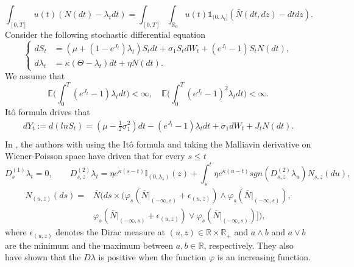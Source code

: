 \documentclass[11pt]{article}
\numberwithin{equation}{section}
\begin{document}
$$\int_{[0, T]} u(t) (N(dt) -\lambda_t dt) =\int_{[0, T]} \int_{\mathbb{R}_0} u(t)\mathbb{1}_{(0, \lambda_t]}(\bar{N}(dt,dz) - dtdz).$$ 
Consider the following stochastic differential equation  
 \begin{equation*}
\begin{cases} 
dS_{t}&=(\mu+(1-e^{J_t})\lambda_t)S_{t}dt+\sigma_{1}S_{t}dW_{t}+(e^{J_t}-1)S_{t}{N}(dt), \\
d\lambda_{t}&=\kappa(\Theta-\lambda_{t})dt+\eta N(dt).
\end{cases}
\end{equation*}
We assume that 
$$\mathbb{E}\Big(\int_0^T (e^{J_t}-1) \lambda_t dt\Big) < \infty, \quad \mathbb{E}\Big(\int_0^T (e^{J_t}-1)^2 \lambda_t dt\Big) < \infty.$$
It\^o formula drives that
\begin{align*}
\nonumber dY_t:= d (ln S_{t})=(\mu-\frac{1}{2}\sigma_1^{2})dt-(e^{J_t}-1)\lambda_t dt+\sigma_1 dW_{t}+J_ t N(dt).\\
\end{align*}
In \cite{torrisi}, the authors with using the It\^o formula and taking the Malliavin derivative on Wiener-Poisson space  have driven that for every $s \leq t$
\begin{equation}\label{14}
D_s^{(1)}\lambda_t=0, \qquad D_{s,z}^{(2)}\lambda_t =  \eta e^{\kappa(s-t)}\mathbb{I}_{(0, \lambda_s)}(z) +\int_s^t \eta e^{\kappa(u-t)} sgn(D_{s,z}^{(2)} \lambda_u) N_{s,z}(du),
\end{equation}
\begin{align}
\nonumber N_{(u,z)}(ds)=&\overline{N}(ds\times(\varphi_s(\overline{N}\lvert_{\left(-\infty,s\right)}+\epsilon_{(u,z)})\land\varphi_s(\overline{N}\lvert_{\left(-\infty,s\right)}),\\ \nonumber &\varphi_s(\overline{N}\lvert_{\left(-\infty,s\right)}+\epsilon_{(u,z)})\lor\varphi_s(\overline{N}\lvert_{\left(-\infty,s\right)})]),
\end{align}
where $\epsilon_{(u,z)}$ denotes the Dirac measure at $(u,z)\in\mathbb{R}\times\mathbb{R_+}$ and $a\land b$ and $a\lor b$ are the minimum and the maximum between $a,b\in\mathbb{R}$, respectively.
They also have shown that the $D\lambda$ is positive when the function $\varphi$ is an increasing function. 
 
\end{document}
